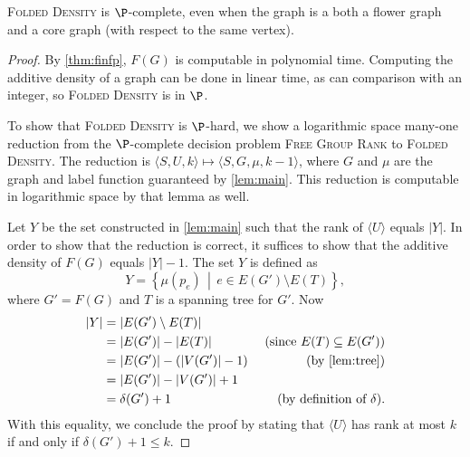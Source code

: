 \documentclass{article}
\newcommand{\FGR}{\textsc{Free Group Rank}}
\newcommand{\FD}{\textsc{Folded Density}}
\newcommand{\gen}[1]{\langle #1 \rangle}
\begin{document}
\begin{theorem}\label{thm:fdpcomplete}
  \FD{} is $\P$-complete, even when the graph is a both a flower graph and a core graph (with respect to the same vertex).
\end{theorem}
\begin{proof}
  By \autoref{thm:finfp}, $F(G)$ is computable in polynomial time.
  Computing the additive density of a graph can be done in linear time, as can comparison with an integer, so \FD{} is in $\P$.

  To show that \FD{} is $\P$-hard, we show a logarithmic space many-one reduction from the $\P$-complete decision problem \FGR{} to \FD{}.
  The reduction is $\langle S, U, k \rangle \mapsto \langle S, G, \mu, k - 1 \rangle$, where $G$ and $\mu$ are the graph and label function guaranteed by \autoref{lem:main}.
  This reduction is computable in logarithmic space by that lemma as well.

  Let $Y$ be the set constructed in \autoref{lem:main} such that the rank of $\gen{U}$ equals $|Y|$.
  In order to show that the reduction is correct, it suffices to show that the additive density of $F(G)$ equals $|Y| - 1$.
  The set $Y$ is defined as
  \begin{equation*}
    Y = \left\{\mu(p_e) \, \middle| \, e \in E(G') \setminus E(T) \right\},
  \end{equation*}
  where $G' = F(G)$ and $T$ is a spanning tree for $G'$.
  Now
  \begin{align*}
    |Y| & = |E(G') \setminus E(T)| & \\
    & = |E(G')| - |E(T)| & \text{ (since } E(T) \subseteq E(G') \text{)} \\
    & = |E(G')| - (|V(G')| - 1) & \text{ (by \autoref{lem:tree})} \\
    & = |E(G')| - |V(G')| + 1 & \\
    & = \delta(G') + 1 & \text{ (by definition of } \delta \text{)}.
  \end{align*}
  With this equality, we conclude the proof by stating that $\gen{U}$ has rank at most $k$ if and only if $\delta(G') + 1 \leq k$.
\end{proof}
\end{document}
